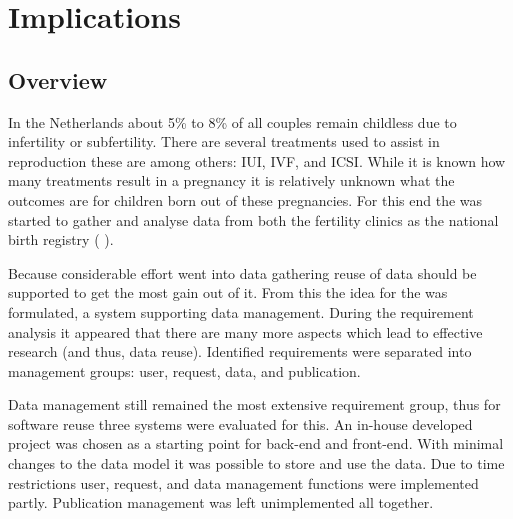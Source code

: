 



\section{Implications}

\subsection{Overview}

In the Netherlands about 5\% to 8\% of all couples remain childless due to infertility or subfertility.
There are several treatments used to assist in reproduction these are among others: IUI, IVF, and ICSI.
While it is known how many treatments result in a pregnancy it is relatively unknown what the outcomes are for children born out of these pregnancies.
For this end the \project{} was started to gather and analyse data from both the fertility clinics as the national birth registry (\ie{} \PRN{}).

Because considerable effort went into data gathering reuse of data should be supported to get the most gain out of it.
From this the idea for the \ivfsystem{} was formulated, a system supporting data management.
During the requirement analysis it appeared that there are many more aspects which lead to effective research (and thus, data reuse).
Identified requirements were separated into management groups: user, request, data, and publication.

Data management still remained the most extensive requirement group, thus for software reuse three systems were evaluated for this.
An in-house developed project was chosen as a starting point for back-end and front-end.
With minimal changes to the data model it was possible to store and use the \project{} data.
Due to time restrictions user, request, and data management functions were implemented partly.
Publication management was left unimplemented all together.

